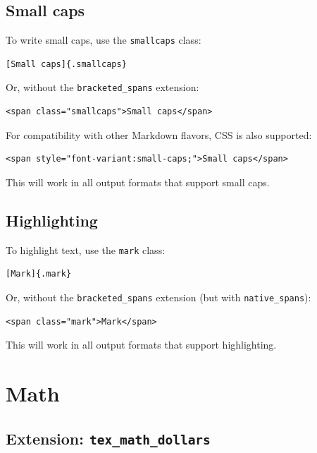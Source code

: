 \documentclass[
  b5paper
]{book}
\begin{document}
\subsection{Small caps}\label{small-caps}

To write small caps, use the \texttt{smallcaps} class:

\begin{verbatim}
[Small caps]{.smallcaps}
\end{verbatim}

Or, without the \texttt{bracketed\_spans} extension:

\begin{verbatim}
<span class="smallcaps">Small caps</span>
\end{verbatim}

For compatibility with other Markdown flavors, CSS is also supported:

\begin{verbatim}
<span style="font-variant:small-caps;">Small caps</span>
\end{verbatim}

This will work in all output formats that support small caps.

\subsection{Highlighting}\label{highlighting}

To highlight text, use the \texttt{mark} class:

\begin{verbatim}
[Mark]{.mark}
\end{verbatim}

Or, without the \texttt{bracketed\_spans} extension (but with
\texttt{native\_spans}):

\begin{verbatim}
<span class="mark">Mark</span>
\end{verbatim}

This will work in all output formats that support highlighting.

\section{Math}\label{math}

\subsection{\texorpdfstring{Extension:
\texttt{tex\_math\_dollars}}{Extension: tex\_math\_dollars}}\label{extension-tex_math_dollars}
\end{document}
